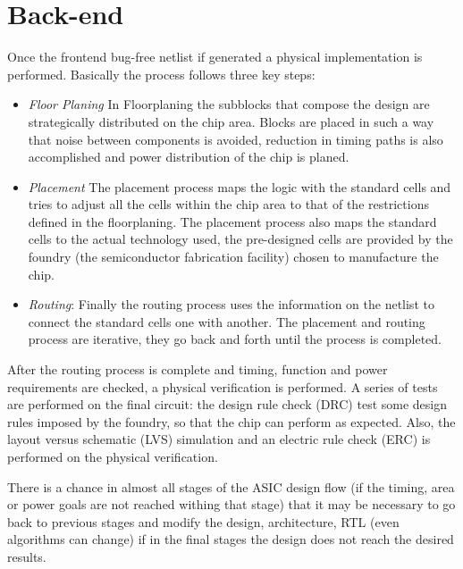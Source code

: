 \section{Back-end}

Once the frontend bug-free netlist if generated a physical implementation is performed. Basically the process follows three key steps: 

\begin{itemize}
\item \emph{Floor Planing} In Floorplaning the subblocks that compose the design are strategically distributed on the chip area. Blocks are placed in such a way that noise between components is avoided, reduction in timing paths is also 
accomplished and power distribution of the chip is planed.

\item \emph{Placement} The placement process maps the logic with the standard cells and tries to adjust all the cells 
within the chip area to that of the restrictions defined in the floorplaning. The placement process also maps the standard cells to the actual technology used, the pre-designed cells are provided by the foundry (the semiconductor fabrication facility) chosen to manufacture the chip. 

\item \emph{Routing}: Finally the routing process uses the information on the netlist to connect the standard cells one with another. The placement and routing process are iterative, they go back and forth until the process is completed. 

\end{itemize}


After the routing process is complete and timing, function and power requirements are checked, a physical verification is performed. A series of tests are performed on the final circuit: the design rule check (DRC) test some design rules imposed by the foundry, so that the chip can perform as expected. Also, the layout versus schematic (LVS) simulation and an electric rule check (ERC) is performed on the physical verification. 

There is a chance in almost all stages of the ASIC design flow  (if the timing, area or power goals are not reached withing that stage) that it may be necessary to go back to previous stages and modify the design, architecture, RTL (even algorithms can change) if in the final stages the design does not reach the desired results. 

